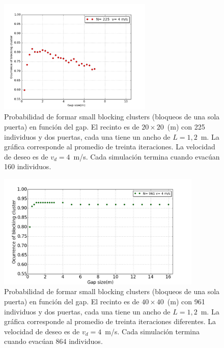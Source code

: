 \begin{figure}[H]
    \centering
    \includegraphics[height=5.5cm]{figuras/proba_vsgap_small_225p_v4.png}
    \caption[width=5cm]{Probabilidad de formar small blocking clusters (bloqueos de una sola puerta) en función del gap. El recinto es de $20\times 20$~(m) con 225 individuos y dos puertas, cada una tiene un ancho de $L=1,2$~m. La gráfica corresponde al promedio de treinta iteraciones. La velocidad de deseo es de $v_d=4$~m/s. Cada simulación termina cuando evacúan 160 individuos.}
    \label{sintesis}
\end{figure}

\begin{figure}[H]
    \centering
    \includegraphics[height=5.5cm]{figuras/proba_vsgap_small_961p_v4.png}
    \caption[width=5cm]{Probabilidad de formar small blocking clusters (bloqueos de una sola puerta) en función del gap. El recinto es de $40\times 40$~(m) con 961 individuos y dos puertas, cada una tiene un ancho de $L=1,2$~m. La gráfica corresponde al promedio de treinta iteraciones diferentes. La velocidad de deseo es de $v_d=4$~m/s. Cada simulación termina cuando evacúan 864 individuos.}
    \label{sintesis}
\end{figure}

